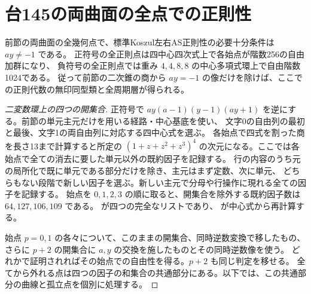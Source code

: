 \section{台145の両曲面の全点での正則性}
\label{sec:parallel-rectangle-surface-regularity}
\begin{theorem}\label{thm:parallel-rectangle-surface-regularity}
前節の両曲面の全幾何点で、標準Koszul左右AS正則性の必要十分条件は $ay\ne-1$ である。
正符号の全正則点は四中心四次式上で各始点が階数256の自由加群になり、
負符号の全正則点では重み $4,4,8,8$ の中心多項式環上で自由階数1024である。
従って前節の二次錐の商から $ay=-1$ の像だけを除けば、ここでの正則代数の無印同型類と全周期層が得られる。
\end{theorem}
\begin{proof}[二変数環上の四つの開集合]
正符号で $ay(a-1)(y-1)(ay+1)$ を逆にする。前節の単元主元だけを用いる経路・中心基底を使い、
文字0の自由列の最初と最後、文字1の両自由列に対応する四中心式を選ぶ。
各始点で四式を割った商を長さ13まで計算すると所定の
$(1+z+z^2+z^3)^4$ の次元になる。ここでは各始点で全ての消去に要した単元以外の既約因子を記録する。
行の内容のうち元の局所化で既に単元である部分だけを除き、主元はまず定数、次に単元、
どちらもない段階で新しい因子を選ぶ。新しい主元で分母や行操作に現れる全ての因子を記録する。
始点を $0,1,2,3$ の順に取ると、開集合を除外する既約因子数は $64,127,106,109$ である。
 が四つの完全なリストであり、
 が中心式から再計算する。

始点 $p=0,1$ の各々について、このままの開集合、同時逆数変換で移したもの、
さらに $p+2$ の開集合に $a,y$ の交換を施したものとその同時逆数像を使う。
どれかで証明されればその始点での自由性を得る。$p+2$ も同じ判定を移せる。
全てから外れる点は四つの因子の和集合の共通部分にある。以下では、この共通部分の曲線と孤立点を個別に処理する。
\end{proof}

